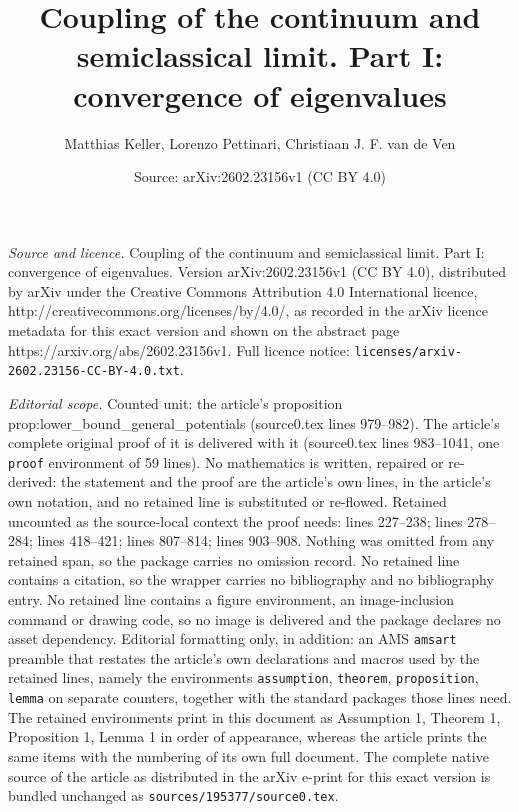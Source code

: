 \documentclass[10pt,a4paper]{amsart}
\title{Coupling of the continuum and semiclassical limit. Part I: convergence of eigenvalues}
\author{Matthias Keller, Lorenzo Pettinari, Christiaan J. F. van de Ven}
\date{Source: arXiv:2602.23156v1 (CC BY 4.0)}
\begin{document}
\maketitle

\noindent\emph{Source and licence.} Coupling of the continuum and semiclassical limit. Part I: convergence of eigenvalues. Version arXiv:2602.23156v1 (CC BY 4.0), distributed by arXiv under the Creative Commons Attribution 4.0 International licence, http://creativecommons.org/licenses/by/4.0/, as recorded in the arXiv licence metadata for this exact version and shown on the abstract page https://arxiv.org/abs/2602.23156v1. Full licence notice: \texttt{licenses/arxiv-2602.23156-CC-BY-4.0.txt}.\par\smallskip

\noindent\textit{Editorial scope.} Counted unit: the article's proposition prop:lower\_bound\_general\_potentials (source0.tex lines 979--982). The article's complete original proof of it is delivered with it (source0.tex lines 983--1041, one \texttt{proof} environment of 59 lines). No mathematics is written, repaired or re-derived: the statement and the proof are the article's own lines, in the article's own notation, and no retained line is substituted or re-flowed.  Retained uncounted as the source-local context the proof needs: lines 227--238; lines 278--284; lines 418--421; lines 807--814; lines 903--908.  Nothing was omitted from any retained span, so the package carries no omission record.  No retained line contains a citation, so the wrapper carries no bibliography and no bibliography entry.  No retained line contains a figure environment, an image-inclusion command or drawing code, so no image is delivered and the package declares no asset dependency.  Editorial formatting only, in addition: an AMS \texttt{amsart} preamble that restates the article's own declarations and macros used by the retained lines, namely the environments \texttt{assumption}, \texttt{theorem}, \texttt{proposition}, \texttt{lemma} on separate counters, together with the standard packages those lines need.  The retained environments print in this document as Assumption 1, Theorem 1, Proposition 1, Lemma 1 in order of appearance, whereas the article prints the same items with the numbering of its own full document.  The complete native source of the article as distributed in the arXiv e-print for this exact version is bundled unchanged as \texttt{sources/195377/source0.tex}.
\end{document}
